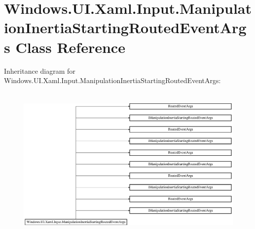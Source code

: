 \hypertarget{class_windows_1_1_u_i_1_1_xaml_1_1_input_1_1_manipulation_inertia_starting_routed_event_args}{}\section{Windows.\+U\+I.\+Xaml.\+Input.\+Manipulation\+Inertia\+Starting\+Routed\+Event\+Args Class Reference}
\label{class_windows_1_1_u_i_1_1_xaml_1_1_input_1_1_manipulation_inertia_starting_routed_event_args}
Inheritance diagram for Windows.\+U\+I.\+Xaml.\+Input.\+Manipulation\+Inertia\+Starting\+Routed\+Event\+Args\+:\begin{figure}[H]
\begin{center}
\leavevmode
\includegraphics[height=7.700000cm]{class_windows_1_1_u_i_1_1_xaml_1_1_input_1_1_manipulation_inertia_starting_routed_event_args}
\end{center}
\end{figure}
